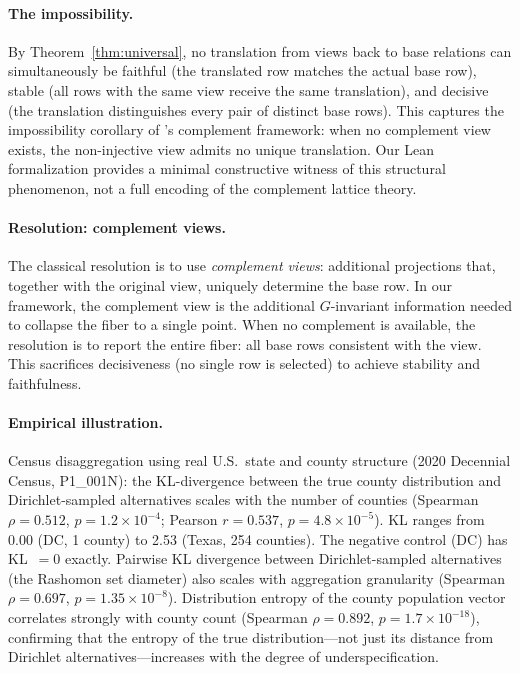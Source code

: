 \paragraph{The impossibility.}
By Theorem~\ref{thm:universal}, no translation from views back to base
relations can simultaneously be faithful (the translated row matches the
actual base row), stable (all rows with the same view receive the same
translation), and decisive (the translation distinguishes every pair of
distinct base rows).  This captures the impossibility corollary of \citet{bancilhon1981update}'s
complement framework: when no complement view exists, the non-injective view
admits no unique translation.  Our Lean formalization provides a minimal
constructive witness of this structural phenomenon, not a full encoding of the
complement lattice theory.

\paragraph{Resolution: complement views.}
The classical resolution \citep{bancilhon1981update} is to use
\emph{complement views}: additional projections that, together with the
original view, uniquely determine the base row.  In our framework, the
complement view is the additional $G$-invariant information needed to
collapse the fiber to a single point.  When no complement is available, the
resolution is to report the entire fiber: all base rows consistent with the
view.  This sacrifices decisiveness (no single row is selected) to achieve
stability and faithfulness.

\paragraph{Empirical illustration.}
Census disaggregation using real U.S.\ state and county structure (2020
Decennial Census, P1\_001N): the KL-divergence between the true county
distribution and Dirichlet-sampled alternatives scales with the number of
counties (Spearman $\rho = 0.512$, $p = 1.2 \times 10^{-4}$; Pearson
$r = 0.537$, $p = 4.8 \times 10^{-5}$).  KL ranges from 0.00 (DC, 1 county)
to 2.53 (Texas, 254 counties).  The negative control (DC) has KL~$= 0$ exactly.
Pairwise KL divergence between Dirichlet-sampled alternatives (the Rashomon
set diameter) also scales with aggregation granularity (Spearman $\rho = 0.697$,
$p = 1.35 \times 10^{-8}$).  Distribution entropy of the county population
vector correlates strongly with county count (Spearman $\rho = 0.892$,
$p = 1.7 \times 10^{-18}$), confirming that the entropy of the true
distribution---not just its distance from Dirichlet alternatives---increases
with the degree of underspecification.


